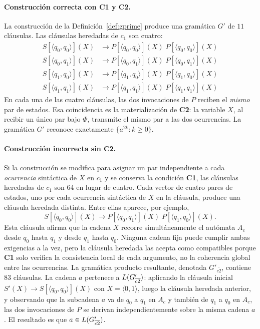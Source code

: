\paragraph{Construcción correcta con \textbf{C1} y \textbf{C2}.} La construcción de la Definición~\ref{def:gprime} produce una gramática $G'$ de $11$ cláusulas. Las cláusulas heredadas de $c_1$ son cuatro:
\[
\begin{aligned}
S[\langle q_0, q_0 \rangle](X) &\to P[\langle q_0, q_0 \rangle](X) \; P[\langle q_0, q_0 \rangle](X) \\
S[\langle q_0, q_1 \rangle](X) &\to P[\langle q_0, q_1 \rangle](X) \; P[\langle q_0, q_1 \rangle](X) \\
S[\langle q_1, q_0 \rangle](X) &\to P[\langle q_1, q_0 \rangle](X) \; P[\langle q_1, q_0 \rangle](X) \\
S[\langle q_1, q_1 \rangle](X) &\to P[\langle q_1, q_1 \rangle](X) \; P[\langle q_1, q_1 \rangle](X)
\end{aligned}
\]
En cada una de las cuatro cláusulas, las dos invocaciones de $P$ reciben el \emph{mismo} par de estados. Esa coincidencia es la materialización de \textbf{C2}: la variable $X$, al recibir un único par bajo $\Phi$, transmite el mismo par a las dos ocurrencias. La gramática $G'$ reconoce exactamente $\{a^{2k} : k \geq 0\}$.

\paragraph{Construcción incorrecta sin \textbf{C2}.} Si la construcción se modifica para asignar un par independiente a cada \emph{ocurrencia} sintáctica de $X$ en $c_1$ y se conserva la condición \textbf{C1}, las cláusulas heredadas de $c_1$ son $64$ en lugar de cuatro. Cada vector de cuatro pares de estados, uno por cada ocurrencia sintáctica de $X$ en la cláusula, produce una cláusula heredada distinta. Entre ellas aparece, por ejemplo,
\[
S[\langle q_0, q_0 \rangle](X) \to P[\langle q_0, q_1 \rangle](X) \; P[\langle q_1, q_0 \rangle](X).
\]
Esta cláusula afirma que la cadena $X$ recorre simultáneamente el autómata $A_c$ desde $q_0$ hasta $q_1$ y desde $q_1$ hasta $q_0$. Ninguna cadena fija puede cumplir ambas exigencias a la vez, pero la cláusula heredada las acepta como compatibles porque \textbf{C1} solo verifica la consistencia local de cada argumento, no la coherencia global entre las ocurrencias. La gramática producto resultante, denotada $G'_{\overline{c2}}$, contiene $83$ cláusulas. La cadena $a$ pertenece a $L(G'_{\overline{c2}})$: aplicando la cláusula inicial $S'(X) \to S[\langle q_0, q_0 \rangle](X)$ con $X = \langle 0, 1 \rangle$, luego la cláusula heredada anterior, y observando que la subcadena $a$ va de $q_0$ a $q_1$ en $A_c$ y también de $q_1$ a $q_0$ en $A_c$, las dos invocaciones de $P$ se derivan independientemente sobre la misma cadena $a$. El resultado es que $a \in L(G'_{\overline{c2}})$.

